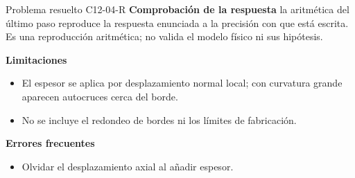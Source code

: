 \documentclass[10pt,openany]{book}
\begin{document}
\begin{studiumworked}{Problema resuelto C12-04-R}
\noindent\textbf{Comprobación de la respuesta} la aritmética del último paso reproduce la respuesta enunciada a la precisión con que está escrita. Es una reproducción aritmética; no valida el modelo físico ni sus hipótesis.

\noindent\textbf{Limitaciones}
\begin{itemize}
\item El espesor se aplica por desplazamiento normal local; con curvatura grande aparecen autocruces cerca del borde.
\item No se incluye el redondeo de bordes ni los límites de fabricación.
\end{itemize}

\noindent\textbf{Errores frecuentes}
\begin{itemize}
\item Olvidar el desplazamiento axial al añadir espesor.
\end{itemize}
\end{studiumworked}
\end{document}
